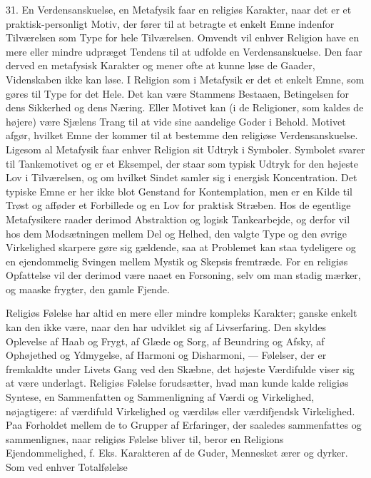 \documentclass[12pt]{article}
\newcommand{\apage}[1]{\marginnote{\footnotesize\textit{[#1]}}}
\begin{document}
\setcounter{footnote}{0}%
\apage{100}31. En Verdensanskuelse, en Metafysik faar en religiøs Karakter,
naar det er et praktisk-personligt Motiv, der fører til at betragte et enkelt
Emne indenfor Tilværelsen som Type for hele Tilværelsen. Omvendt vil enhver
Religion have en mere eller mindre udpræget Tendens til at udfolde en
Verdensanskuelse. Den faar derved en metafysisk Karakter og mener ofte at kunne
løse de Gaader, Videnskaben ikke kan løse. I Religion som i Metafysik er det et
enkelt Emne, som gøres til Type for det Hele. Det kan være Stammens Bestaaen,
Betingelsen for dens Sikkerhed og dens Næring. Eller Motivet kan (i de
Religioner, som kaldes de højere) være Sjælens Trang til at vide sine aandelige
Goder i Behold. Motivet afgør, hvilket Emne der kommer til at bestemme den
religiøse Verdensanskuelse. Ligesom al Metafysik faar enhver Religion sit
Udtryk i Symboler. Symbolet svarer til Tankemotivet og er et Eksempel, der
staar som typisk Udtryk for den højeste Lov i Tilværelsen, og om hvilket Sindet
samler sig i energisk Koncentration. Det typiske Emne er her ikke blot Genstand
for Kontemplation, men er en Kilde til Trøst og afføder et Forbillede og en Lov
for praktisk Stræben. Hos de egentlige Metafysikere raader derimod Abstraktion
og logisk Tankearbejde, og derfor vil hos dem Modsætningen mellem Del og
Helhed, den valgte Type og
\setcounter{footnote}{0}%
\apage{101}den øvrige Virkelighed skarpere gøre sig gældende, saa at Problemet
kan staa tydeligere og en ejendommelig Svingen mellem Mystik og Skepsis
fremtræde. For en religiøs Opfattelse vil der derimod være naaet en Forsoning,
selv om man stadig mærker, og maaske frygter, \guillemotright{}den gamle
Fjende\guillemotleft{}.

Religiøs Følelse har altid en mere eller mindre kompleks Karakter; ganske
enkelt kan den ikke være, naar den har udviklet sig af Livserfaring. Den
skyldes Oplevelse af Haab og Frygt, af Glæde og Sorg, af Beundring og Afsky, af
Ophøjethed og Ydmygelse, af Harmoni og Disharmoni, --- Følelser, der er
fremkaldte under Livets Gang ved den Skæbne, det højeste Værdifulde viser sig
at være underlagt. Religiøs Følelse forudsætter, hvad man kunde kalde religiøs
Syntese, en Sammenfatten og Sammenligning af Værdi og Virkelighed, nøjagtigere:
af værdifuld Virkelighed og værdiløs eller værdifjendsk Virkelighed. Paa
Forholdet mellem de to Grupper af Erfaringer, der saaledes sammenfattes og
sammenlignes, naar religiøs Følelse bliver til, beror en Religions
Ejendommelighed, f. Eks. Karakteren af de Guder, Mennesket ærer og dyrker. Som
ved enhver Totalfølelse
\end{document}
